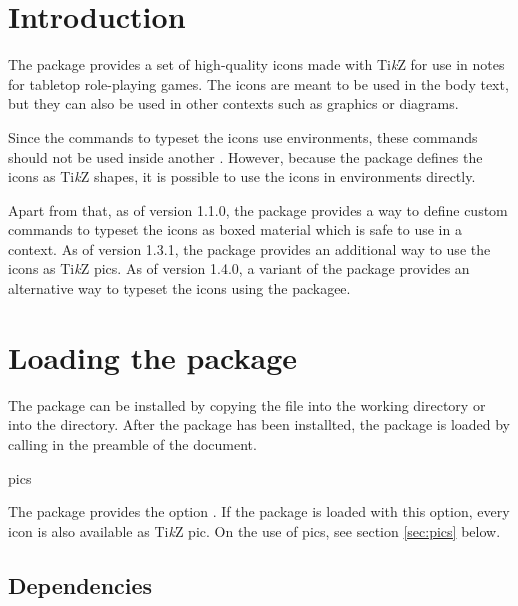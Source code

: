 \documentclass[a4paper]{article}
\begin{document}
\vspace*{-1cm}
\noindent\dndiconslogo[4]

\bigskip

\printdoctitle

\bigskip

\section{Introduction}

The  package provides a set of high-quality icons made with Ti\emph{k}Z for use in notes for tabletop role-playing games. The icons are meant to be used in the body text, but they can also be used in other contexts such as graphics or diagrams.

Since the commands to typeset the icons use  environments, these commands should not be used inside another . However, because the package defines the icons as Ti\emph{k}Z shapes, it is possible to use the icons in  environments directly. 

Apart from that, as of version 1.1.0, the package provides a way to define custom commands to typeset the icons as boxed material which is safe to use in a  context. As of version 1.3.1, the package provides an additional way to use the icons as Ti\emph{k}Z pics. As of version 1.4.0, a variant of the package provides an alternative way to typeset the icons using the  packagee.

\section{Loading the package}

The package can be installed by copying the file  into the working directory or into the  directory. After the package has been installted, the  package is loaded by calling \macro{\usepackage{dndicons}} in the preamble of the document. 

\begin{macrodef}pics\end{macrodef}
The package provides the option . If the package is loaded with this option, every icon is also available as Ti\emph{k}Z pic. On the use of pics, see section \ref{sec:pics} below.

\subsection{Dependencies}
\end{document}
